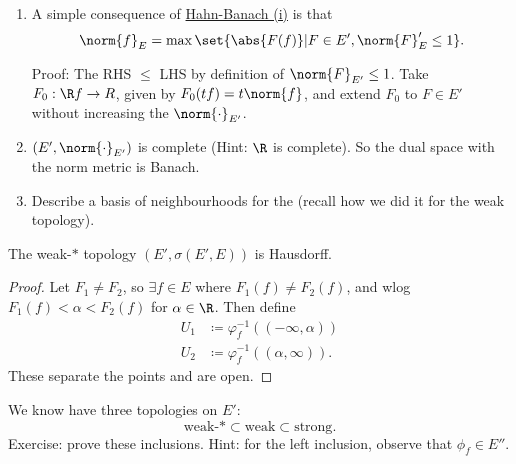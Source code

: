 \documentclass[twoside]{article}
\begin{document}
\begin{ex}\leavevmode
    \begin{enumerate}[label=(\arabic*)]
        \item A simple consequence of \hyperlink{thm:hb}{Hahn-Banach (i)} is that
            \begin{equation*}
                \norm{f}_E = \max\set{\abs{F(f)} | F \in E', \norm{F}_E' \leq 1}.
            \end{equation*}

            Proof: The RHS $\leq$ LHS by definition of $\norm{F}_{E'} \leq 1$.
            Take $F_0: \R f \to R$, given by $F_0(tf) = t \norm{f}$, and extend $F_0$ to $F \in E'$ without increasing the $\norm{\cdot}_{E'}$.
        \item $(E', \norm{\cdot}_{E'})$ is complete (Hint: $\R$ is complete). So the dual space with the norm metric is Banach.
        \item Describe a basis of neighbourhoods for the (recall how we did it for the weak topology).
    \end{enumerate}
\end{ex}
\begin{prop}
    The weak-$*$ topology $(E', \sigma(E', E))$ is Hausdorff.
\end{prop}
\begin{proof}
    Let $F_1 \neq F_2$, so $\exists f \in E$ where $F_1(f) \neq F_2(f)$, and wlog $F_1(f) < \alpha < F_2(f)$ for $\alpha \in \R$.
    Then define
    \begin{align*}
        U_1 &\coloneqq \varphi_f^{-1}((-\infty, \alpha)) \\
        U_2 &\coloneqq \varphi_f^{-1}((\alpha, \infty)).
    \end{align*}
    These separate the points and are open.
\end{proof}
\begin{remark}
    We know have three topologies on $E'$:
    \begin{equation*}
        \text{weak-}* \subset \text{weak} \subset \text{strong}.
    \end{equation*}
    Exercise: prove these inclusions. Hint: for the left inclusion, observe that $\phi_f \in E''$.
\end{remark}
\end{document}
